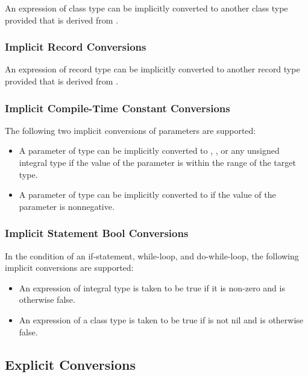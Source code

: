 An expression of class type  can be implicitly converted to
another class type  provided that  is derived
from .

\subsubsection{Implicit Record Conversions}
\label{Implicit_Record_Conversions}

An expression of record type  can be implicitly converted to
another record type  provided that  is derived
from .

\subsubsection{Implicit Compile-Time Constant Conversions}
\label{Implicit_Compile_Time_Constant_Conversions}

The following two implicit conversions of parameters are supported:
\begin{itemize}
\item A parameter of type  can be implicitly converted
to , , or any unsigned integral type if the
value of the parameter is within the range of the target type.
\item A parameter of type  can be implicitly converted
to  if the value of the parameter is nonnegative.
\end{itemize}

\subsubsection{Implicit Statement Bool Conversions}
\label{Implicit_Statement_Bool_Conversions}

In the condition of an if-statement, while-loop, and do-while-loop,
the following implicit conversions are supported:
\begin{itemize}
\item An expression of integral type is taken to be true if it is non-zero and is otherwise false.
\item An expression of a class type is taken to be true if is not nil and is otherwise false.
\end{itemize}

\subsection{Explicit Conversions}
\label{Explicit_Conversions}

